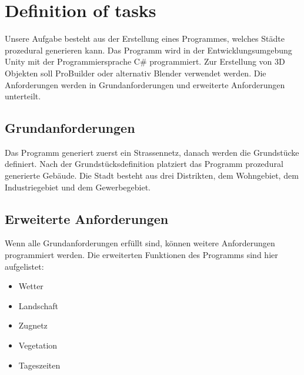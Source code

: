 \section{Definition of tasks}
Unsere Aufgabe besteht aus der Erstellung eines Programmes, welches Städte prozedural generieren kann. Das Programm wird in der Entwicklungsumgebung Unity mit der Programmiersprache C\# programmiert. Zur Erstellung von 3D Objekten soll ProBuilder oder alternativ Blender verwendet werden. Die Anforderungen werden in Grundanforderungen und erweiterte Anforderungen unterteilt.

\subsection{Grundanforderungen}
Das Programm generiert zuerst ein Strassennetz, danach werden die Grundstücke definiert. Nach der Grundstücksdefinition platziert das Programm prozedural generierte Gebäude. Die Stadt besteht aus drei Distrikten, dem Wohngebiet, dem Industriegebiet und dem Gewerbegebiet. 

\subsection{Erweiterte Anforderungen}
Wenn alle Grundanforderungen erfüllt sind, können weitere Anforderungen programmiert werden. Die erweiterten Funktionen des Programms sind hier aufgelistet:
\begin{itemize}
\item Wetter
\item Landschaft
\item Zugnetz
\item Vegetation
\item Tageszeiten
\end{itemize}